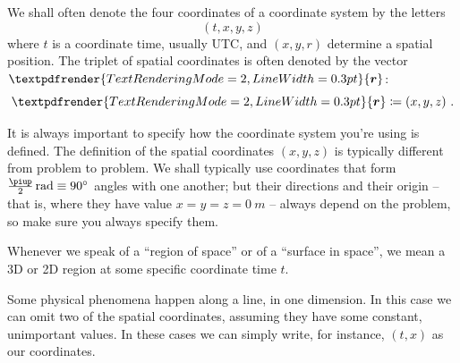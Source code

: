 \documentclass[a4paper,12pt,%
onecolumn,oneside,titlepage,%
british%
]{memoir}
\renewcommand*{\bm}[1]{\textpdfrender{TextRenderingMode=2,LineWidth=0.3pt}{\boldsymbol{#1}}}
\newcommand*{\pu}{\piup}%
\newcommand*{\defd}{\coloneqq}
\renewcommand*{\|}[1][]{\nonscript\:#1\vert\nonscript\:\mathopen{}}
\newcommand*{\yr}{\bm{r}}
\begin{document}
\smallskip

We shall often denote the four coordinates of a coordinate system by the letters
\begin{equation*}
  (t, x, y, z)
\end{equation*}
where $t$ is a coordinate time, usually UTC, and $(x,y,r)$ determine a spatial position. The triplet of spatial coordinates is often denoted by the vector $\yr$:
\begin{equation*}
  \yr \defd (x,y,z) \ .
\end{equation*}

It is always important to specify how the coordinate system you're using is defined.
The definition of the spatial coordinates $(x,y,z)$ is typically different from problem to problem. We shall typically use coordinates that form $\frac{\pu}{2}\,\unit{rad} \equiv \ang{90}$ angles with one another; but their directions and their origin -- that is, where they have value $x=y=z=\qty{0}{m}$ -- always depend on the problem, so make sure you always specify them.

Whenever we speak of a \enquote{region of space} or of a \enquote{surface in space}, we mean a 3D or 2D region at some specific coordinate time $t$.

\smallskip

Some physical phenomena happen along a line, in one dimension. In this case we can omit two of the spatial coordinates, assuming they have some constant, unimportant values. In these cases we can simply write, for instance, $(t,x)$ as our coordinates.
\end{document}
